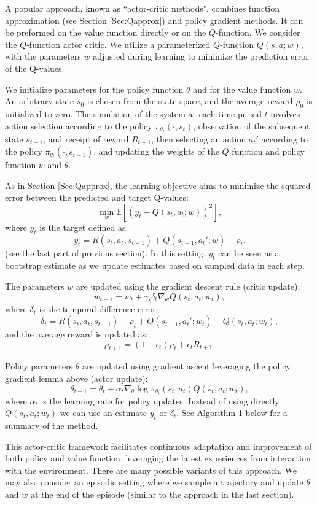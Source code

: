 \documentclass[letter,11pt]{article}
\begin{document}
A popular approach, known as ``actor-critic methods", combines function approximation (see Section \ref{Sec:Qapprox}) and policy gradient methods. It can be preformed on the value function  directly or on the $Q$-function. We consider the $Q$-function actor critic. 
We utilize a parameterized $Q$-function \( Q(s, a; w) \), with the parameters \( w \) adjusted during learning to minimize the prediction error of the Q-values.

We initialize parameters for the policy function $\theta$ and for the value function $w$. An arbitrary state $s_0$ is chosen from the state space, and the average reward $\rho_0$ is initialized to zero. The simulation of the system at each time period $t$ involves action selection according to the policy $\pi_{\theta_t}(\cdot, s_{t})$, observation of the subsequent state $s_{t+1}$, and receipt of reward $R_{t+1}$, then selecting an action $a_{t}'$ according to the policy $\pi_{\theta_t}(\cdot, s_{t+1})$, and updating the weights of the $Q$ function and policy function $w$ and $\theta$.

As in Section \ref{Sec:Qapprox}, the learning objective aims to minimize the squared error between the predicted and target Q-values:
\[
\min_w \mathbb{E} \left[ \left( y_t - Q(s_t, a_t; w) \right)^2 \right],
\]
where \( y_t \) is the target defined as:
\[
y_t = R(s_{t},a_{t},s_{t+1}) + Q(s_{t+1}, a_{t}'; w) - \rho_t.
\]
(see the last part of previous section).  
In this setting, \( y_t \) can be seen as a bootstrap estimate as we update estimates based on sampled data in each step. 


The parameters \( w \) are updated using the gradient descent rule (critic update):
\[
w_{t+1} = w_t + \gamma_t \delta_{t} \nabla_w Q(s_t, a_t; w_t),
\]
where \( \delta_t \) is the temporal difference error:
\[
\delta_t = R(s_{t},a_{t},s_{t+1}) - \rho_t + Q(s_{t+1}, a_{t}'; w_{t}) - Q(s_t, a_t; w_{t}),
\]
and the average reward is updated as:
\[
\rho_{t+1} = (1-\epsilon_t) \rho_t + \epsilon_t R_{t+1}.
\]

Policy parameters \(\theta\) are updated using gradient ascent leveraging the policy gradient lemma above (actor update):
\[
\theta_{t+1} = \theta_t + \alpha_t \nabla_\theta \log \pi_{\theta_{t}}(s_t, a_t) Q(s_{t},a_{t};w_{t}),
\]
where \(\alpha_t\) is the learning rate for policy updates. Instead of using directly $ Q(s_{t},a_{t};w_{t})$ we can use an estimate $y_{t}$ or $\delta_{t}$. See Algorithm 1 below for a summary of the method. 

This actor-critic framework facilitates continuous adaptation and improvement of both policy and value function, leveraging the latest experiences from interaction with the environment. There are many possible variants of this approach. We may also consider an episodic setting where we sample a trajectory and update $\theta$ and $w$ at the end of the episode (similar to the approach in the last section). 
\end{document}
